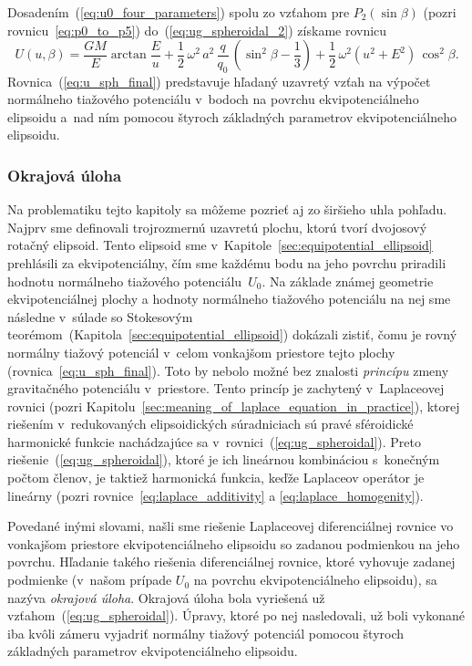 \documentclass[a4paper, 12pt]{book}
\begin{document}
Dosadením~(\ref{eq:u0_four_parameters}) spolu zo vzťahom pre $P_2(\sin\beta)$ 
(pozri rovnicu~\ref{eq:p0_to_p5}) do~(\ref{eq:ug_spheroidal_2}) získame rovnicu
%
\begin{equation}
\label{eq:u_sph_final}
U(u, \beta) = \frac{GM}{E} \arctan\frac{E}{u} + \frac{1}{2} \, \omega^2 \, a^2 
\, \frac{q}{q_0} \, \left( \sin^2\beta - \frac{1}{3} \right) + \frac{1}{2} \, 
\omega^2 (u^2 + E^2) \, \cos^2\beta{.}
\end{equation}
%
Rovnica~(\ref{eq:u_sph_final}) predstavuje hľadaný uzavretý vzťah na výpočet 
normálneho tiažového potenciálu v~bodoch na povrchu ekvipotenciálneho elipsoidu 
a~nad ním pomocou štyroch základných parametrov ekvipotenciálneho elipsoidu.



\subsubsection{Okrajová úloha}
\label{sec:u_boundary_value_problem}

Na problematiku tejto kapitoly sa môžeme pozrieť aj zo širšieho uhla pohľadu.  
Najprv sme definovali trojrozmernú uzavretú plochu, ktorú tvorí dvojosový 
rotačný elipsoid.  Tento elipsoid sme 
v~Kapitole~\ref{sec:equipotential_ellipsoid} prehlásili za ekvipotenciálny, čím 
sme každému bodu na jeho povrchu priradili hodnotu normálneho tiažového 
potenciálu~$U_0$.  Na základe známej geometrie ekvipotenciálnej plochy 
a hodnoty normálneho tiažového potenciálu na nej sme následne v~súlade so 
Stokesovým teorémom~(Kapitola~\ref{sec:equipotential_ellipsoid}) dokázali 
zistiť, čomu je rovný normálny tiažový potenciál v~celom vonkajšom priestore 
tejto plochy (rovnica~\ref{eq:u_sph_final}).  Toto by nebolo možné bez znalosti 
\emph{princípu} zmeny gravitačného potenciálu v~priestore.  Tento princíp je 
zachytený v~Laplaceovej rovnici (pozri 
Kapitolu~\ref{sec:meaning_of_laplace_equation_in_practice}), ktorej riešením 
v~redukovaných elipsoidických súradniciach sú pravé sféroidické harmonické 
funkcie nachádzajúce sa v~rovnici~(\ref{eq:ug_spheroidal}).  Preto 
riešenie~(\ref{eq:ug_spheroidal}), ktoré je ich lineárnou kombináciou 
s~konečným počtom členov, je taktiež harmonická funkcia, keďže Laplaceov 
operátor je lineárny (pozri rovnice~\ref{eq:laplace_additivity} 
a \ref{eq:laplace_homogenity}).

Povedané inými slovami, našli sme riešenie Laplaceovej diferenciálnej rovnice 
vo vonkajšom priestore ekvipotenciálneho elipsoidu so zadanou podmienkou na 
jeho povrchu.  Hľadanie takého riešenia diferenciálnej rovnice, ktoré vyhovuje 
zadanej podmienke (v~našom prípade $U_0$ na povrchu ekvipotenciálneho 
elipsoidu), sa nazýva \emph{okrajová úloha}.  Okrajová úloha bola vyriešená už 
vzťahom~(\ref{eq:ug_spheroidal}).  Úpravy, ktoré po nej nasledovali, už boli 
vykonané iba kvôli zámeru vyjadriť normálny tiažový potenciál pomocou štyroch 
základných parametrov ekvipotenciálneho elipsoidu.
\end{document}
